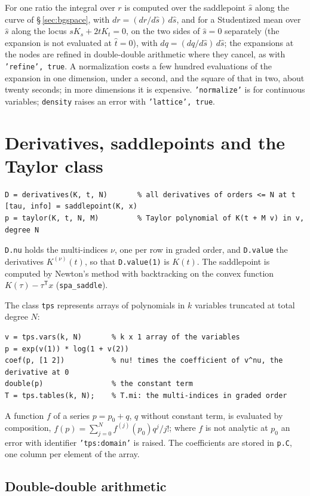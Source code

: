 \documentclass[11pt]{article}
\newcommand{\prog}[1]{\texttt{#1}}
\newcommand{\tp}{^{\mathsf T}}
\begin{document}
For one ratio the integral over $r$ is computed over the saddlepoint $\hat s$ along the curve of
\S\,\ref{sec:bgspace}, with $dr=(dr/d\hat s)\,d\hat s$, and for a Studentized mean over $\hat s$ along
the locus $sK_s+2tK_t=0$, on the two sides of $\hat s=0$ separately (the expansion is not evaluated
at $\hat t=0$), with $dq=(dq/d\hat s)\,d\hat s$; the expansions at the nodes are refined in
double-double arithmetic where they cancel, as with \prog{'refine', true}. A normalization costs a
few hundred evaluations of the expansion in one dimension, under a second, and the square of that in
two, about twenty seconds; in more dimensions it is expensive. \prog{'normalize'} is for continuous
variables; \prog{density} raises an error with \prog{'lattice', true}.

\section{Derivatives, saddlepoints and the Taylor class}\label{sec:tps}

\begin{lstlisting}
D = derivatives(K, t, N)       % all derivatives of orders <= N at t
[tau, info] = saddlepoint(K, x)
p = taylor(K, t, N, M)         % Taylor polynomial of K(t + M v) in v, degree N
\end{lstlisting}
\prog{D.nu} holds the multi-indices $\nu$, one per row in graded order, and \prog{D.value} the
derivatives $K^{(\nu)}(t)$, so that \prog{D.value(1)} is $K(t)$. The saddlepoint is computed by
Newton's method with backtracking on the convex function $K(\tau)-\tau\tp x$ (\prog{spa\_saddle}).

The class \prog{tps} represents arrays of polynomials in $k$ variables truncated at total degree
$N$:
\begin{lstlisting}
v = tps.vars(k, N)       % k x 1 array of the variables
p = exp(v(1)) * log(1 + v(2))
coef(p, [1 2])           % nu! times the coefficient of v^nu, the derivative at 0
double(p)                % the constant term
T = tps.tables(k, N);    % T.mi: the multi-indices in graded order
\end{lstlisting}
A function $f$ of a series $p=p_0+q$, $q$ without constant term, is evaluated by composition,
$f(p)=\sum_{j=0}^{N}f^{(j)}(p_0)q^j/j!$; where $f$ is not analytic at $p_0$ an error with identifier
\prog{'tps:domain'} is raised. The coefficients are stored in \prog{p.C}, one column per element of
the array.

\subsection{Double-double arithmetic}\label{sec:dd}
\end{document}
